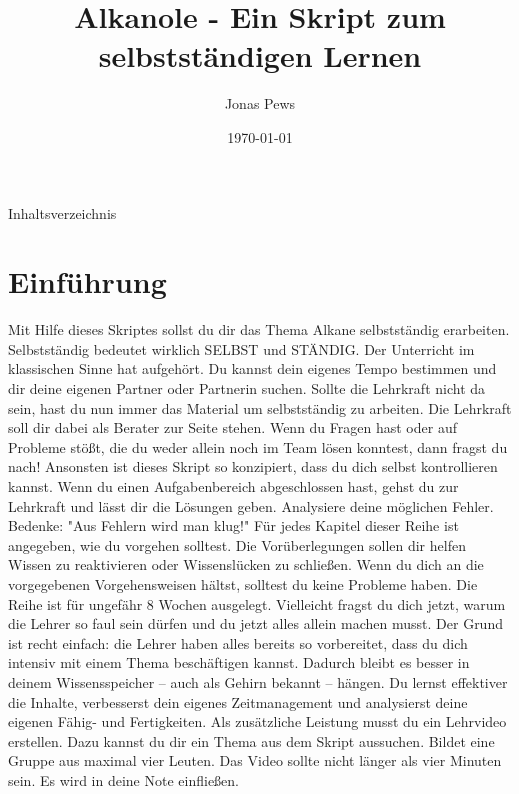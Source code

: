 \documentclass{scrartcl}  %
\author{Jonas Pews}
\title{Alkanole - Ein Skript zum selbstständigen Lernen}
\date{\today}
\renewcommand{\tableofcontents}{Inhaltsverzeichnis}
\begin{document}
	\maketitle
	
	\begin{center}
		\ccbyncsa
	\end{center}
	

\pagebreak

	\tableofcontents

\pagebreak
		
		\section{Einführung}
	
			Mit Hilfe dieses Skriptes sollst du dir das Thema Alkane selbstständig erarbeiten. Selbstständig bedeutet wirklich SELBST und STÄNDIG. Der Unterricht im klassischen Sinne hat aufgehört. Du kannst dein eigenes Tempo bestimmen und dir deine eigenen Partner oder Partnerin suchen. Sollte die Lehrkraft nicht da sein, hast du nun immer das Material um selbstständig zu arbeiten.
			Die Lehrkraft soll dir dabei als Berater zur Seite stehen. Wenn du Fragen hast oder auf Probleme stößt, die du weder allein noch im Team lösen konntest, dann fragst du nach!
			Ansonsten ist dieses Skript so konzipiert, dass du dich selbst kontrollieren kannst. Wenn du einen Aufgabenbereich abgeschlossen hast, gehst du zur Lehrkraft und lässt dir die Lösungen geben. Analysiere deine möglichen Fehler. Bedenke: "Aus Fehlern wird man klug!"
			Für jedes Kapitel dieser Reihe ist angegeben, wie du vorgehen solltest. Die Vorüberlegungen sollen dir helfen Wissen zu reaktivieren oder Wissenslücken zu schließen. Wenn du dich an die vorgegebenen Vorgehensweisen hältst, solltest du keine Probleme haben.
			Die Reihe ist für ungefähr 8 Wochen ausgelegt.
			Vielleicht fragst du dich jetzt, warum die Lehrer so faul sein dürfen und du jetzt alles allein machen musst. Der Grund ist recht einfach: die Lehrer haben alles bereits so vorbereitet, dass du dich intensiv mit einem Thema beschäftigen kannst. Dadurch bleibt es besser in deinem Wissensspeicher – auch als Gehirn bekannt – hängen. Du lernst effektiver die Inhalte, verbesserst dein eigenes Zeitmanagement und analysierst deine eigenen Fähig- und Fertigkeiten.
			Als zusätzliche Leistung musst du ein Lehrvideo erstellen. Dazu kannst du dir ein Thema aus dem Skript aussuchen. Bildet eine Gruppe aus maximal vier Leuten. Das Video sollte nicht länger als vier Minuten sein. Es wird in deine Note einfließen.
	
\end{document}
